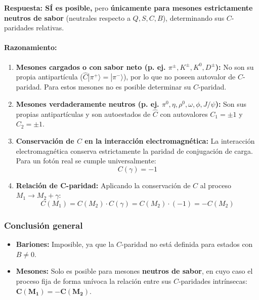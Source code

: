 \begin{problema}
\textbf{Respuesta: SÍ es posible,} pero \textbf{únicamente para mesones estrictamente neutros de sabor} (neutrales respecto a $Q, S, C, B$), determinando sus $C$-paridades relativas.

\paragraph{Razonamiento:}
\begin{enumerate}[label=\arabic*.]
    \item \textbf{Mesones cargados o con sabor neto (p. ej. $\pi^\pm, K^\pm, K^0, D^\pm$):} No son su propia antipartícula ($\hat{C}|\pi^+\rangle = |\pi^-\rangle$), por lo que no poseen autovalor de $C$-paridad. Para estos mesones no es posible determinar su $C$-paridad.

    \item \textbf{Mesones verdaderamente neutros (p. ej. $\pi^0, \eta, \rho^0, \omega, \phi, J/\psi$):} Son sus propias antipartículas y son autoestados de $\hat{C}$ con autovalores $C_1 = \pm 1$ y $C_2 = \pm 1$.

    \item \textbf{Conservación de $C$ en la interacción electromagnética:} La interacción electromagnética conserva estrictamente la paridad de conjugación de carga. Para un fotón real se cumple universalmente:
    \begin{equation*}
    C(\gamma) = -1
    \end{equation*}

    \item \textbf{Relación de C-paridad:} Aplicando la conservación de $C$ al proceso $M_1 \rightarrow M_2 + \gamma$:
    \begin{equation*}
    C(M_1) = C(M_2) \cdot C(\gamma) = C(M_2) \cdot (-1) = -C(M_2)
    \end{equation*}
\end{enumerate}

\subsubsection*{Conclusión general}
\begin{itemize}
    \item \textbf{Bariones:} Imposible, ya que la $C$-paridad no está definida para estados con $B \neq 0$.
    \item \textbf{Mesones:} Solo es posible para mesones \textbf{neutros de sabor}, en cuyo caso el proceso fija de forma unívoca la relación entre sus $C$-paridades intrínsecas: $\mathbf{C(M_1) = -C(M_2)}$.
\end{itemize}
\end{problema}
